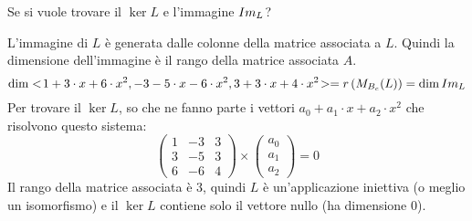 \begin{exmp}
Se si vuole trovare il $\ker L$ e l'immagine $Im_{L}$?

L'immagine di $L$ \`e generata dalle colonne della matrice associata a $L$. Quindi la dimensione dell'immagine \`e il rango della matrice associata $A$.
\[
\dim <\!{1 + 3 \cdot x + 6 \cdot x^2, -3 -5 \cdot x - 6 \cdot x^2, 3 + 3 \cdot x + 4 \cdot x^2}\!> =
r \left( M_{B_c} (L) \right) = \dim Im_{L}
\]
Per trovare il $\ker L$, so che ne fanno parte i vettori $a_0 + a_1 \cdot x + a_2 \cdot x^2$ che risolvono questo sistema:
\[
\begin{pmatrix}
1 & -3 & 3 \\
3 & -5 & 3 \\
6 & -6 & 4
\end{pmatrix}
\times
\begin{pmatrix}
a_0 \\ a_1 \\ a_2
\end{pmatrix}
= 0
\]
Il rango della matrice associata \`e 3, quindi $L$ \`e un'applicazione iniettiva (o meglio un isomorfismo) e il $\ker L$ contiene solo il vettore nullo (ha dimensione 0).
\end{exmp}

